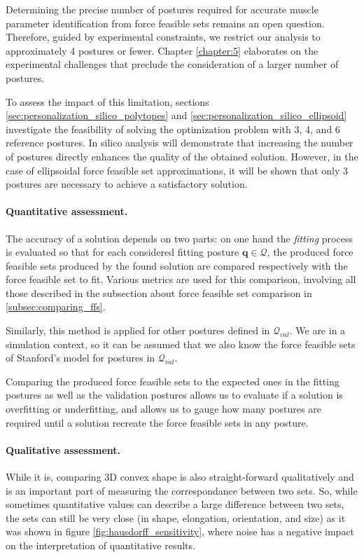 Determining the precise number of postures required for accurate muscle parameter identification from force feasible sets remains an open question. Therefore, guided by experimental constraints, we restrict our analysis to approximately 4 postures or fewer. Chapter \ref{chapter:5} elaborates on the experimental challenges that preclude the consideration of a larger number of postures.

To assess the impact of this limitation, sections \ref{sec:personalization_silico_polytopes} and \ref{sec:personalization_silico_ellipsoid} investigate the feasibility of solving the optimization problem with 3, 4, and 6 reference postures. In silico analysis will demonstrate that increasing the number of postures directly enhances the quality of the obtained solution. However, in the case of ellipsoidal force feasible set approximations, it will be shown that only 3 postures are necessary to achieve a satisfactory solution.

\paragraph*{Quantitative assessment.} The accuracy of a solution depends on two parts: on one hand the \emph{fitting} process is evaluated so that for each considered fitting posture $\mathbf{q}\in\mathcal{Q}$, the produced force feasible sets produced by the found solution are compared respectively with the force feasible set to fit. Various metrics are used for this comparison, involving all those described in the subsection about force feasible set comparison in \ref{subsec:comparing_ffs}.

Similarly, this method is applied for other postures defined in $\mathcal{Q}_{val}$. We are in a simulation context, so it can be assumed that we also know the force feasible sets of Stanford's model for postures in $\mathcal{Q}_{val}$.

Comparing the produced force feasible sets to the expected ones in the fitting postures as well as the validation postures allows us to evaluate if a solution is overfitting or underfitting, and allows us to gauge how many postures are required until a solution recreate the force feasible sets in any posture. 

\paragraph*{Qualitative assessment.} While it is, comparing 3D convex shape is also straight-forward qualitatively and is an important part of measuring the correspondance between two sets. So, while sometimes quantitative values can describe a large difference between two sets, the sets can still be very close (in shape, elongation, orientation, and size) as it was shown in figure \ref{fig:hausdorff_sensitivity}, where noise has a negative impact on the interpretation of quantitative results. 

